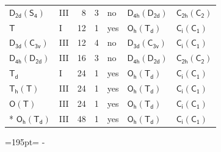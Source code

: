 \documentclass[10pt,a4paper]{article}
\newcommand{\needspace}[1]{\par\penalty-100\begingroup\dimen0=#1\relax\dimen2=\pagegoal
  \advance\dimen2-\pagetotal\ifdim\dimen0>\dimen2\relax\ifdim\dimen2>0pt\vfil\break\fi\fi
  \endgroup}
\numberwithin{equation}{section}
\newcommand{\grp}[1]{\mathsf{#1}}
\begin{document}
{\begin{longtable}{@{}llrrlll@{}}
\href{D2d-S4.pdf}{$\grp{D_{2d}}(\grp{S_{4}})$} & III & 8 & 3 & no & \href{D4h-D2d.pdf}{$\grp{D_{4h}}(\grp{D_{2d}})$} & \href{C2h-C2.pdf}{$\grp{C_{2h}}(\grp{C_{2}})$}\\
\href{../../../rotation/data/pdf/T.pdf}{$\grp{T}$} & I & 12 & 1 & yes & \href{Oh-Td.pdf}{$\grp{O_{h}}(\grp{T_{d}})$} & \href{S2-C1.pdf}{$\grp{C_{i}}(\grp{C_{1}})$}\\
\href{D3d-C3v.pdf}{$\grp{D_{3d}}(\grp{C_{3v}})$} & III & 12 & 4 & no & \href{D3d-C3v.pdf}{$\grp{D_{3d}}(\grp{C_{3v}})$} & \href{S2-C1.pdf}{$\grp{C_{i}}(\grp{C_{1}})$}\\
\href{D4h-D2d.pdf}{$\grp{D_{4h}}(\grp{D_{2d}})$} & III & 16 & 3 & no & \href{D4h-D2d.pdf}{$\grp{D_{4h}}(\grp{D_{2d}})$} & \href{C2h-C2.pdf}{$\grp{C_{2h}}(\grp{C_{2}})$}\\
\href{../../../rotation/data/pdf/Td.pdf}{$\grp{T_{d}}$} & I & 24 & 1 & yes & \href{Oh-Td.pdf}{$\grp{O_{h}}(\grp{T_{d}})$} & \href{S2-C1.pdf}{$\grp{C_{i}}(\grp{C_{1}})$}\\
\href{Th-T.pdf}{$\grp{T_{h}}(\grp{T})$} & III & 24 & 1 & yes & \href{Oh-Td.pdf}{$\grp{O_{h}}(\grp{T_{d}})$} & \href{S2-C1.pdf}{$\grp{C_{i}}(\grp{C_{1}})$}\\
\href{O-T.pdf}{$\grp{O}(\grp{T})$} & III & 24 & 1 & yes & \href{Oh-Td.pdf}{$\grp{O_{h}}(\grp{T_{d}})$} & \href{S2-C1.pdf}{$\grp{C_{i}}(\grp{C_{1}})$}\\*
\href{Oh-Td.pdf}{$\grp{O_{h}}(\grp{T_{d}})$} & III & 48 & 1 & yes & \href{Oh-Td.pdf}{$\grp{O_{h}}(\grp{T_{d}})$} & \href{S2-C1.pdf}{$\grp{C_{i}}(\grp{C_{1}})$}\\
\bottomrule\end{longtable}}
\needspace{195pt}
\end{document}
